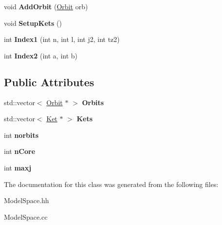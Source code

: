 \begin{DoxyCompactItemize}
\item 
\hypertarget{classModelSpace_ad8acc2ca5b475862101595d911987a7e}{void {\bfseries Add\-Orbit} (\hyperlink{classOrbit}{Orbit} orb)}\label{classModelSpace_ad8acc2ca5b475862101595d911987a7e}

\item 
\hypertarget{classModelSpace_ae1a3578ed5aabec2956998a870a4e2d2}{void {\bfseries Setup\-Kets} ()}\label{classModelSpace_ae1a3578ed5aabec2956998a870a4e2d2}

\item 
\hypertarget{classModelSpace_acdf0b97564b897d30f665a3a8f85fcf7}{int {\bfseries Index1} (int n, int l, int j2, int tz2)}\label{classModelSpace_acdf0b97564b897d30f665a3a8f85fcf7}

\item 
\hypertarget{classModelSpace_a8b7687bd47920cb29848962bbb3a86c7}{int {\bfseries Index2} (int a, int b)}\label{classModelSpace_a8b7687bd47920cb29848962bbb3a86c7}

\end{DoxyCompactItemize}
\subsection*{Public Attributes}
\begin{DoxyCompactItemize}
\item 
\hypertarget{classModelSpace_ae26284ee026396d3165bb787c3b1a33b}{std\-::vector$<$ \hyperlink{classOrbit}{Orbit} $\ast$ $>$ {\bfseries Orbits}}\label{classModelSpace_ae26284ee026396d3165bb787c3b1a33b}

\item 
\hypertarget{classModelSpace_a16697f11b417d01b7e7972e5b4b62870}{std\-::vector$<$ \hyperlink{classKet}{Ket} $\ast$ $>$ {\bfseries Kets}}\label{classModelSpace_a16697f11b417d01b7e7972e5b4b62870}

\item 
\hypertarget{classModelSpace_af5970e6865dd69177eb0f74fa269ff17}{int {\bfseries norbits}}\label{classModelSpace_af5970e6865dd69177eb0f74fa269ff17}

\item 
\hypertarget{classModelSpace_a43c328f29287f82b04749a39b88f8402}{int {\bfseries n\-Core}}\label{classModelSpace_a43c328f29287f82b04749a39b88f8402}

\item 
\hypertarget{classModelSpace_a85e9c691ed5c42e9ebacb6d1147bbc0d}{int {\bfseries maxj}}\label{classModelSpace_a85e9c691ed5c42e9ebacb6d1147bbc0d}

\end{DoxyCompactItemize}


The documentation for this class was generated from the following files\-:\begin{DoxyCompactItemize}
\item 
Model\-Space.\-hh\item 
Model\-Space.\-cc\end{DoxyCompactItemize}
